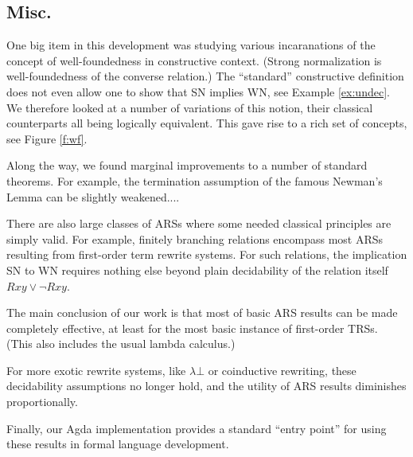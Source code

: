 \documentclass{scrartcl}
\begin{document}
\subsection{Misc.}
One big item in this development was studying various incaranations of the concept of well-foundedness in constructive context.
(Strong normalization is well-foundedness of the converse relation.)
The ``standard'' constructive definition does not even allow one to show that SN implies WN, see Example \ref{ex:undec}.  We therefore looked at a number of variations of this notion, their classical counterparts all being logically equivalent.  This gave rise to a rich set of concepts, see Figure \ref{f:wf}.

Along the way, we found marginal improvements to a number of standard theorems.
For example, the termination assumption of the famous Newman's Lemma can be slightly weakened....

There are also large classes of ARSs where some needed classical principles are simply valid.  For example, finitely branching relations encompass most ARSs resulting from first-order term rewrite systems.  For such relations, the implication SN to WN requires nothing else beyond plain decidability of
the relation itself $Rxy \lor \lnot Rxy$.

The main conclusion of our work is that most of basic ARS results can be made completely effective, at least for the most basic instance of first-order TRSs.
(This also includes the usual lambda calculus.)

For more exotic rewrite systems, like $\lambda \bot$ or coinductive rewriting,
these decidability assumptions no longer hold, and the utility of ARS results diminishes proportionally.

Finally, our Agda implementation provides a standard ``entry point'' for using these results in formal language development.
\end{document}
